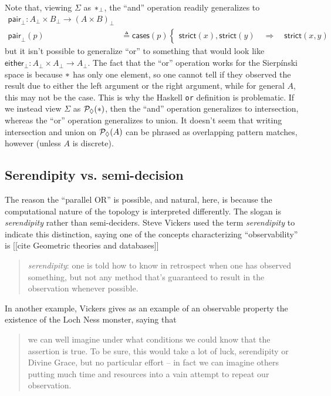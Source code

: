Note that, viewing $\Sigma$ as $\ast_\bot$, the ``and'' operation readily generalizes to 
\begin{align*}
 \mathsf{pair}_\bot: A_\bot \times B_\bot \to \left( A \times B \right)_\bot
\\ \mathsf{pair}_\bot(p) &\triangleq \mathsf{cases}(p)
\begin{cases}
\mathsf{strict}(x) , \mathsf{strict}(y)
  \quad \Longrightarrow \quad \mathsf{strict}(x, y)
\end{cases}
\end{align*}
but it isn't possible to generalize ``or'' to something that would look like $ \mathsf{either}_\bot: A_\bot \times A_\bot \to A_\bot$. The fact that the ``or'' operation works for the Sierp\'inski space is because $\ast$ has only one element, so one cannot tell if they observed the result due to either the left argument or the right argument, while for general $A$, this may not be the case. This is why the Haskell \texttt{or} definition is problematic. If we instead view $\Sigma$ as $\mathcal{P}_\lozenge(\ast)$, then the ``and'' operation generalizes to intersection, whereas the ``or'' operation generalizes to union. It doesn't seem that writing intersection and union on $\mathcal{P}_\lozenge(A)$ can be phrased as overlapping pattern matches, however (unless $A$ is discrete).

\subsection{Serendipity vs. semi-decision}

The reason the ``parallel OR'' is possible, and natural, here, is because the computational nature of the topology is interpreted differently. The slogan is \emph{serendipity} rather than semi-deciders. Steve Vickers used the term \emph{serendipity} to indicate this distinction, saying one of the concepts characterizing ``observability'' is [[cite Geometric theories and databases]]
\begin{quote}
\emph{serendipity}: one is told how to know in retrospect when one has observed something, but not any method that’s guaranteed to result in the observation whenever possible.
\end{quote}

In another example, Vickers gives as an example of an observable property the existence of the Loch Ness monster, saying that
\begin{quote}
we can well imagine under what conditions we could know that the assertion is true. To be sure, this would take a lot of luck, serendipity or Divine Grace, but no particular effort -- in fact we can imagine others putting much time and resources into a vain attempt to repeat our observation.
\end{quote}

